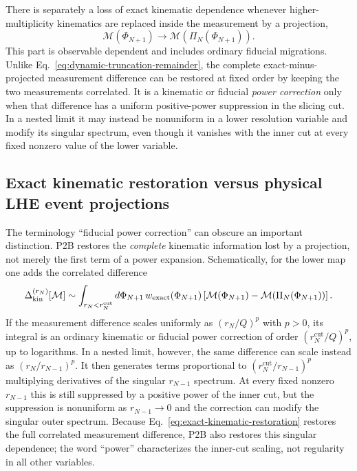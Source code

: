 \documentclass[11pt]{article}
\newcommand{\rnm}{r_{N-1}}
\newcommand{\rn}{r_N}
\newcommand{\cut}{\mathrm{cut}}
\newcommand{\Ph}{\Phi}
\newcommand{\Mcal}{\mathcal{M}}
\begin{document}
There is separately a loss of exact kinematic dependence whenever higher-multiplicity kinematics are replaced
inside the measurement by a projection,
\begin{equation}
\Mcal(\Ph_{N+1})\longrightarrow
\Mcal\!\left(\Pi_N(\Ph_{N+1})\right).
\label{eq:fixed-order-lower-measurement-projection}
\end{equation}
This part is observable dependent and includes ordinary fiducial migrations. Unlike
Eq.~\eqref{eq:dynamic-truncation-remainder}, the complete exact-minus-projected measurement difference can be
restored at fixed order by keeping the two measurements correlated. It is a kinematic or fiducial
\emph{power correction} only when that difference has a uniform positive-power suppression in the slicing
cut. In a nested limit it may instead be nonuniform in a lower resolution variable and modify its singular
spectrum, even though it vanishes with the inner cut at every fixed nonzero value of the lower variable.

\subsection{Exact kinematic restoration versus physical LHE event projections}
\label{subsec:fixed-order-does-not-require-uniform-nested-locality}

The terminology ``fiducial power correction'' can obscure an important distinction. P2B restores the
\emph{complete} kinematic information lost by a projection, not merely the first term of a power expansion.
Schematically, for the lower map one adds the correlated difference
\begin{equation}
\Delta_{\rm kin}^{(\rn)}[\Mcal]
\sim
\int_{\rn<\rn^{\cut}}d\Ph_{N+1}\,
w_{\rm exact}(\Ph_{N+1})
\left[
\Mcal(\Ph_{N+1})-
\Mcal\!\left(\Pi_N(\Ph_{N+1})\right)
\right].
\label{eq:exact-kinematic-restoration}
\end{equation}
If the measurement difference scales uniformly as $(\rn/Q)^p$ with $p>0$, its integral is an ordinary
kinematic or fiducial power correction of order $(\rn^{\cut}/Q)^p$, up to logarithms. In a nested limit,
however, the same difference can scale instead as $(\rn/\rnm)^p$. It then generates terms proportional to
$(\rn^{\cut}/\rnm)^p$ multiplying derivatives of the singular $\rnm$ spectrum. At every fixed nonzero
$\rnm$ this is still suppressed by a positive power of the inner cut, but the suppression is nonuniform as
$\rnm\to0$ and the correction can modify the singular outer spectrum. Because Eq.~\eqref{eq:exact-kinematic-restoration}
restores the full correlated measurement difference, P2B also restores this singular dependence; the word
``power'' characterizes the inner-cut scaling, not regularity in all other variables.
\end{document}
